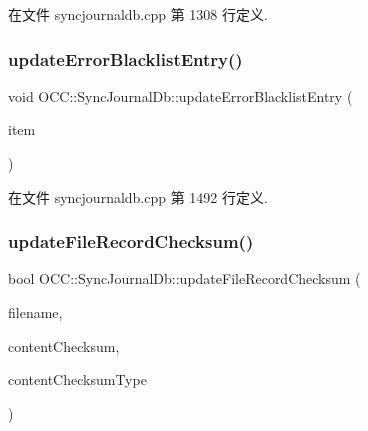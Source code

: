 在文件 syncjournaldb.\+cpp 第 1308 行定义.

\mbox{\label{class_o_c_c_1_1_sync_journal_db_a0781a2d4c5bb4dae808669d5a9fa4c87}} 
\subsubsection{\texorpdfstring{update\+Error\+Blacklist\+Entry()}{updateErrorBlacklistEntry()}}
{\footnotesize\ttfamily void O\+C\+C\+::\+Sync\+Journal\+Db\+::update\+Error\+Blacklist\+Entry (\begin{DoxyParamCaption}\item[{const \hyperlink{class_o_c_c_1_1_sync_journal_error_blacklist_record}{Sync\+Journal\+Error\+Blacklist\+Record} \&}]{item }\end{DoxyParamCaption})}



在文件 syncjournaldb.\+cpp 第 1492 行定义.

\mbox{\label{class_o_c_c_1_1_sync_journal_db_a9ebef1639495b1e4a3a1020398398e3e}} 
\subsubsection{\texorpdfstring{update\+File\+Record\+Checksum()}{updateFileRecordChecksum()}}
{\footnotesize\ttfamily bool O\+C\+C\+::\+Sync\+Journal\+Db\+::update\+File\+Record\+Checksum (\begin{DoxyParamCaption}\item[{const Q\+String \&}]{filename,  }\item[{const Q\+Byte\+Array \&}]{content\+Checksum,  }\item[{const Q\+Byte\+Array \&}]{content\+Checksum\+Type }\end{DoxyParamCaption})}



